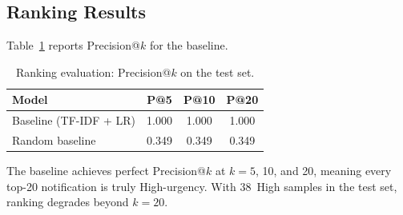 
\subsection{Ranking Results}

Table~\ref{tab:ranking} reports Precision@$k$ for the baseline.

\begin{table}[!t]
\centering
\caption{Ranking evaluation: Precision@$k$ on the test set.}
\label{tab:ranking}
\begin{tabular}{lccc}
\hline
\textbf{Model} & \textbf{P@5} & \textbf{P@10} & \textbf{P@20} \\
\hline
Baseline (TF-IDF + LR) & 1.000 & 1.000 & 1.000 \\
Random baseline         & 0.349 & 0.349 & 0.349 \\
\hline
\end{tabular}
\end{table}

The baseline achieves perfect Precision@$k$ at $k = 5$, 10, and 20,
meaning every top-20 notification is truly High-urgency. With
38~High samples in the test set, ranking degrades beyond $k = 20$.

%
%
